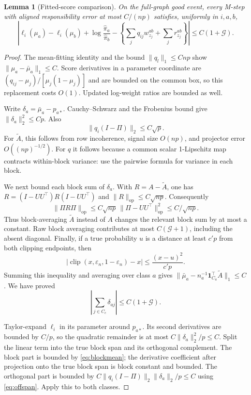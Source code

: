 \documentclass[11pt]{article}
\newtheorem{lemma}[theorem]{Lemma}
\theoremstyle{definition}
\theoremstyle{remark}
\newcommand{\one}{\mathbf 1}
\numberwithin{equation}{section}
\begin{document}
\begin{lemma}[Fitted-score comparison]\label{lem:fit}
On the full-graph good event, every M-step with aligned responsibility error at most $C/(np)$ satisfies, uniformly in $i,a,b$,
\begin{equation}\label{eq:fit-comparison}
 \left|\ell_i(\mu_a)-\ell_i(\mu_b)+\log\frac{\widehat\pi_a}{\widehat\pi_b}
 -\left\{\sum_jq_{ij}w_{z_j}^{ab}+\sum_jr_{z_j}^{ab}\right\}\right|
 \le C(1+\mathcal G).
\end{equation}
\end{lemma}
\begin{proof}
The mean-fitting identity and the bound $\|q_l\|_1\le Cnp$ show $\|\mu_a-\bar\mu_a\|_1\le C$. Score derivatives in a parameter coordinate are $(q_{ij}-\mu_j)/[\mu_j(1-\mu_j)]$ and are bounded on the common box, so this replacement costs $O(1)$. Updated log-weight ratios are bounded as well.

Write $\delta_a=\bar\mu_a-p_{a*}$. Cauchy--Schwarz and the Frobenius bound give $\|\delta_a\|_2^2\le Cp$. Also
\begin{equation}\label{eq:offspan}
 \|q_i(I-\Pi)\|_2\le C\sqrt p.
\end{equation}
For $\widetilde A$, this follows from row incoherence, signal size $O(np)$, and projector error $O((np)^{-1/2})$. For $q$ it follows because a common scalar 1-Lipschitz map contracts within-block variance: use the pairwise formula for variance in each block.

We next bound each block sum of $\delta_a$. With $R=A-\widetilde A$, one has $R=(I-UU^\top)R(I-UU^\top)$ and $\|R\|_{\mathrm{op}}\le C\sqrt{np}$. Consequently
\[
 \|\Pi R\Pi\|_{\mathrm{op}}\le C\sqrt{np}\,\|\Pi-UU^\top\|_{\mathrm{op}}^2
 \le C/\sqrt{np}.
\]
Thus block-averaging $\widetilde A$ instead of $A$ changes the relevant block sum by at most a constant. Raw block averaging contributes at most $C(\mathcal G+1)$, including the absent diagonal. Finally, if a true probability $u$ is a distance at least $c'p$ from both clipping endpoints, then
\[
 |\operatorname{clip}(x,\varepsilon_n,1-\varepsilon_n)-x|\le\frac{(x-u)^2}{c'p}.
\]
Summing this inequality and averaging over class $a$ gives $\|\bar\mu_a-n_a^{-1}\one_{C_a}^\top \widetilde A\|_1\le C$. We have proved
\begin{equation}\label{eq:blockmean}
 \left|\sum_{j\in C_c}\delta_{aj}\right|\le C(1+\mathcal G).
\end{equation}

Taylor-expand $\ell_i$ in its parameter around $p_{a*}$. Its second derivatives are bounded by $C/p$, so the quadratic remainder is at most $C\|\delta_a\|_2^2/p\le C$. Split the linear term into the true block span and its orthogonal complement. The block part is bounded by \eqref{eq:blockmean}; the derivative coefficient after projection onto the true block span is block constant and bounded. The orthogonal part is bounded by $C\|q_i(I-\Pi)\|_2\|\delta_a\|_2/p\le C$ using \eqref{eq:offspan}. Apply this to both classes.
\end{proof}
\end{document}
